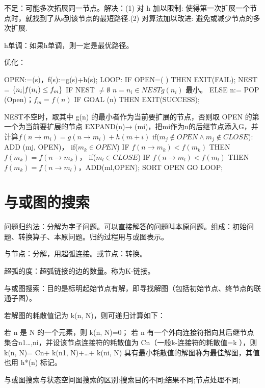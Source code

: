 \documentclass[twocolumn,zihao=5,linespread=1,heading=false,autoindent=0pt]{ctexart}
\DeclarePairedDelimiter{\set}{\{}{\}}
\theoremstyle{exampstyle} \newtheorem{definition}{定义}[section]
\theoremstyle{exampstyle} \newtheorem{example}{例}[section]
\theoremstyle{exampstyle} \newtheorem{theorem}{定理}[section]
\theoremstyle{exampstyle} \newtheorem{lemma}{引理}[section]
\theoremstyle{exampstyle} \newtheorem{myproof}{证明}[section]
\begin{document}
不足：可能多次拓展同一节点。解决：(1) 对 h 加以限制: 使得第一次扩展一个节点时，就找到了从s到该节点的最短路径.(2) 对算法加以改进: 避免或减少节点的多次扩展.

h单调：如果h单调，则一定是最优路径。

优化：
\begin{outline}[citemize]
    \1 OPEN:=(s)，f(s):=g(s)+h(s); 
    \1 LOOP: IF OPEN=( ) THEN EXIT(FAIL); 
    \1 NEST = $\set*{n_i | f(n_i) \le f_m}$
    \1 IF NEST $\ne \emptyset$ $n = n_i \in NEST g(n_i)$ 最小。
    \1 ELSE n:= POP (Open)；$f_m = f(n)$
    \1 IF GOAL (n)  THEN EXIT(SUCCESS); 
        
    NEST不空时，取其中 g(n) 的最小者作为当前要扩展的节点，否则取 OPEN 的第一个为当前要扩展的节点
    \1 EXPAND(n)→ (mi)，把mi作为n的后继节点添入G，并计算$f(n \to m_i) = g(n \to m_i) + h(m+i)$
        \2 if($m_j \notin OPEN \land m_j \notin CLOSE$): ADD (mj, OPEN)， 
        \2 if($m_k\in OPEN$) IF $f(n \to m_k) < f(m_k)$  THEN $f(m_k) = f(n \to m_k)$， 
        \2 if($m_l\in CLOSE$) IF $f(n \to m_l) < f(m_l)$  THEN $f(m_k) = f(n \to m_l)$，ADD(ml,OPEN); 
    \1 SORT OPEN
    \1 GO LOOP; 
\end{outline}

\vspace{-\baselineskip}
\section{与或图的搜索}
问题归约法：分解为字子问题。可以直接解答的问题叫本原问题。组成：初始问题、转换算子、本原问题。归约过程用与或图表示。

与节点：分解，用超弧连接。或节点：转换。

超弧的度：超弧链接的边的数量。称为K-链接。

与或图搜索：目的是标明起始节点有解，即寻找解图（包括初始节点、终节点的联通子图）。

若解图的耗散值记为 k(n, N)，则可递归计算如下：
\begin{outline}[citemize]
\1 若 n 是 N 的一个元素，则 k(n, N)=0；
\1 若 n 有一个外向连接符指向其后继节点集合{n1…,ni}，并设该节点连接符的耗散值为 Cn（一般k-连接符的耗散值=k ），则
   \2 k(n, N)= Cn+ k(n1, N)+…+ k(ni, N)
\1 具有最小耗散值的解图称为最佳解图，其值也用 h*(n) 标记。
\end{outline}

与或图搜索与状态空间图搜索的区别:搜索目的不同;结果不同;节点处理不同;
\end{document}
